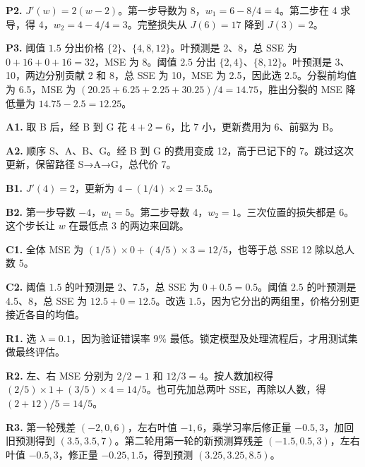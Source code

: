 \documentclass[UTF8,a4paper,11pt]{ctexart}
\begin{document}
\textbf{P2.} $J'(w)=2(w-2)$。第一步导数为 8，$w_1=6-8/4=4$。第二步在 4 求导，得 4，$w_2=4-4/4=3$。完整损失从 $J(6)=17$ 降到 $J(3)=2$。

\textbf{P3.} 阈值 $1.5$ 分出价格 $\{2\}$、$\{4,8,12\}$。叶预测是 2、8，总 SSE 为 $0+16+0+16=32$，MSE 为 8。阈值 $2.5$ 分出 $\{2,4\}$、$\{8,12\}$。叶预测是 3、10，两边分别贡献 2 和 8，总 SSE 为 10，MSE 为 2.5，因此选 $2.5$。分裂前均值为 6.5，MSE 为 $(20.25+6.25+2.25+30.25)/4=14.75$，胜出分裂的 MSE 降低量为 $14.75-2.5=12.25$。

\textbf{A1.} 取 B 后，经 B 到 G 花 $4+2=6$，比 7 小，更新费用为 6、前驱为 B。

\textbf{A2.} 顺序 S、A、B、G。经 B 到 G 的费用变成 12，高于已记下的 7。跳过这次更新，保留路径 S→A→G，总代价 7。

\textbf{B1.} $J'(4)=2$，更新为 $4-(1/4)\times2=3.5$。

\textbf{B2.} 第一步导数 $-4$，$w_1=5$。第二步导数 4，$w_2=1$。三次位置的损失都是 6。这个步长让 $w$ 在最低点 3 的两边来回跳。

\textbf{C1.} 全体 MSE 为 $(1/5)\times0+(4/5)\times3=12/5$，也等于总 SSE 12 除以总人数 5。

\textbf{C2.} 阈值 $1.5$ 的叶预测是 2、7.5，总 SSE 为 $0+0.5=0.5$。阈值 $2.5$ 的叶预测是 4.5、8，总 SSE 为 $12.5+0=12.5$。改选 $1.5$，因为它分出的两组里，价格分别更接近各自的均值。

\textbf{R1.} 选 $\lambda=0.1$，因为验证错误率 9\% 最低。锁定模型及处理流程后，才用测试集做最终评估。

\textbf{R2.} 左、右 MSE 分别为 $2/2=1$ 和 $12/3=4$。按人数加权得 $(2/5)\times1+(3/5)\times4=14/5$。也可先加总两叶 SSE，再除以人数，得 $(2+12)/5=14/5$。

\textbf{R3.} 第一轮残差 $(-2,0,6)$，左右叶值 $-1,6$，乘学习率后修正量 $-0.5,3$，加回旧预测得到 $(3.5,3.5,7)$。第二轮用第一轮的新预测算残差 $(-1.5,0.5,3)$，左右叶值 $-0.5,3$，修正量 $-0.25,1.5$，得到预测 $(3.25,3.25,8.5)$。
\end{document}
